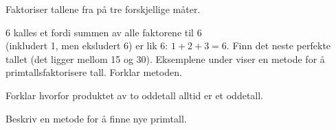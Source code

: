 Faktoriser tallene fra  på tre forskjellige måter.

6 kalles et  fordi summen av alle faktorene til 6 \\(inkludert 1, men eksludert 6) er lik 6: $ 1+2+3=6 $. Finn det neste perfekte tallet (det ligger mellom 15 og 30).
\newpage
{}
Eksemplene under viser en metode for å primtallsfaktorisere tall. Forklar metoden.
\begin{center}
	\parbox{0.35\linewidth}{
		} \qquad
	\parbox{0.35\linewidth}{
		}
\end{center} 


\newpage
{}
Forklar hvorfor produktet av to oddetall alltid er et oddetall.

Beskriv en metode for å finne nye primtall.


